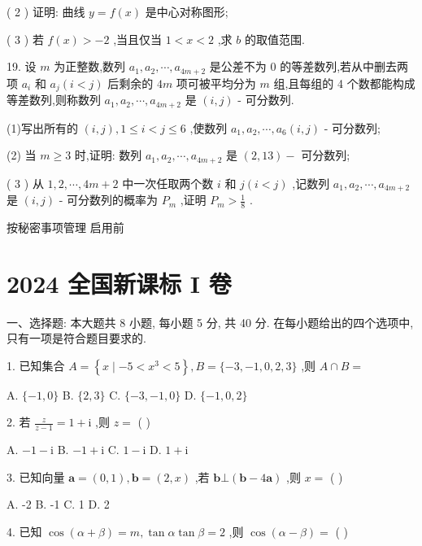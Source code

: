 \documentclass[10pt]{article}
\begin{document}
( 2 ) 证明: 曲线 \(y = f\left( x\right)\) 是中心对称图形;

( 3 ) 若 \(f\left( x\right)  >  - 2\) ,当且仅当 \(1 < x < 2\) ,求 \(b\) 的取值范围.

19. 设 \(m\) 为正整数,数列 \({a}_{1},{a}_{2},\cdots ,{a}_{{4m} + 2}\) 是公差不为 0 的等差数列,若从中删去两项 \({a}_{i}\) 和 \({a}_{j}\left( {i < j}\right)\) 后剩余的 \({4m}\) 项可被平均分为 \(m\) 组,且每组的 4 个数都能构成等差数列,则称数列 \({a}_{1},{a}_{2},\cdots ,{a}_{{4m} + 2}\) 是 \(\left( {i,j}\right)\) - 可分数列.

(1)写出所有的 \(\left( {i,j}\right) ,1 \leq  i < j \leq  6\) ,使数列 \({a}_{1},{a}_{2},\cdots ,{a}_{6}\left( {i,j}\right)\) - 可分数列;

(2) 当 \(m \geq  3\) 时,证明: 数列 \({a}_{1},{a}_{2},\cdots ,{a}_{{4m} + 2}\) 是 \(\left( {2,{13}}\right)  -\) 可分数列;

( 3 ) 从 \(1,2,\cdots ,{4m} + 2\) 中一次任取两个数 \(i\) 和 \(j\left( {i < j}\right)\) ,记数列 \({a}_{1},{a}_{2},\cdots ,{a}_{{4m} + 2}\) 是 \(\left( {i,j}\right)\) - 可分数列的概率为 \({P}_{m}\) ,证明 \({P}_{m} > \frac{1}{8}\) .

按秘密事项管理  启用前

\section*{2024 全国新课标 I 卷}

一、选择题: 本大题共 8 小题, 每小题 5 分, 共 40 分. 在每小题给出的四个选项中, 只有一项是符合题目要求的.

1. 已知集合 \(A = \left\{  {x \mid   - 5 < {x}^{3} < 5}\right\}  ,B = \{  - 3, - 1,0,2,3\}\) ,则 \(A \cap  B =\)

A. \(\{  - 1,0\}\) B. \(\{ 2,3\}\) C. \(\{  - 3, - 1,0\}\) D. \(\{  - 1,0,2\}\)

2. 若 \(\frac{z}{z - 1} = 1 + \mathrm{i}\) ,则 \(z =\) ( )

A. \(- 1 - \mathrm{i}\) B. \(- 1 + \mathrm{i}\) C. \(1 - \mathrm{i}\) D. \(1 + \mathrm{i}\)

3. 已知向量 \(\mathbf{a} = \left( {0,1}\right) ,\mathbf{b} = \left( {2,x}\right)\) ,若 \(\mathbf{b} \bot  \left( {\mathbf{b} - 4\mathbf{a}}\right)\) ,则 \(x =\) ( )

A. -2 B. -1 C. 1 D. 2

4. 已知 \(\cos \left( {\alpha  + \beta }\right)  = m,\tan \alpha \tan \beta  = 2\) ,则 \(\cos \left( {\alpha  - \beta }\right)  =\) ( )
\end{document}
